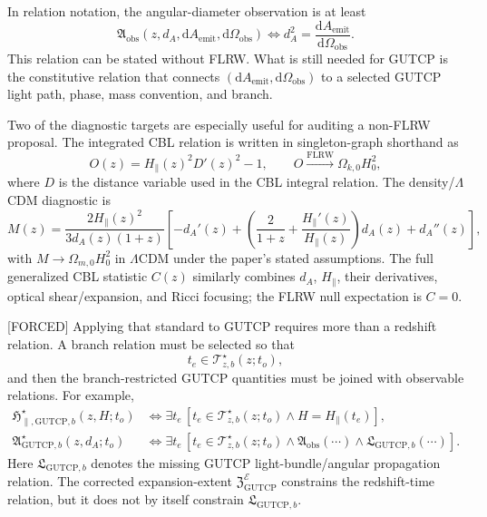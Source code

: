 \documentclass[11pt]{article}
\newcommand{\dd}{\mathrm{d}}
\newcommand{\EG}{\mathcal{E}}
\newcommand{\ZRel}{\mathfrak{Z}_{\mathrm{GUTCP}}}
\begin{document}
In relation notation, the angular-diameter observation is at least
\begin{equation}
\mathfrak{A}_{\mathrm{obs}}
\left(z,d_A,\dd A_{\mathrm{emit}},\dd\Omega_{\mathrm{obs}}\right)
\Longleftrightarrow
d_A^2=\frac{\dd A_{\mathrm{emit}}}{\dd\Omega_{\mathrm{obs}}}.
\label{eq:angular-diameter-observation}
\end{equation}
This relation can be stated without FLRW.  What is still needed for GUTCP is
the constitutive relation that connects
\((\dd A_{\mathrm{emit}},\dd\Omega_{\mathrm{obs}})\) to a selected GUTCP light
path, phase, mass convention, and branch.

Two of the diagnostic targets are especially useful for auditing a non-FLRW
proposal.  The integrated CBL relation is written in singleton-graph shorthand as
\begin{equation}
O(z)=H_{\parallel}(z)^2D'(z)^2-1,
\qquad
O \xrightarrow{\mathrm{FLRW}} \Omega_{k,0}H_0^2,
\label{eq:kh-o}
\end{equation}
where \(D\) is the distance variable used in the CBL integral relation.  The
density/\(\Lambda\)CDM diagnostic is
\begin{equation}
M(z)=
\frac{2H_{\parallel}(z)^2}{3d_A(z)(1+z)}
\left[
-d_A'(z)
+\left(\frac{2}{1+z}+\frac{H_{\parallel}'(z)}{H_{\parallel}(z)}\right)d_A(z)
+d_A''(z)
\right],
\label{eq:kh-m}
\end{equation}
with \(M\to\Omega_{m,0}H_0^2\) in \(\Lambda\)CDM under the paper's stated
assumptions.  The full generalized CBL statistic \(C(z)\) similarly combines
\(d_A\), \(H_{\parallel}\), their derivatives, optical shear/expansion, and
Ricci focusing; the FLRW null expectation is \(C=0\).

[FORCED] Applying that standard to GUTCP requires more than a redshift
relation.  A branch relation must be selected so that
\[
t_e\in\mathcal{T}_{z,b}^{\star}(z;t_o),
\]
and then the branch-restricted GUTCP quantities must be joined with
observable relations.  For example,
\begin{align}
\mathfrak{H}_{\parallel,\mathrm{GUTCP},b}^{\star}(z,H;t_o)
&\Longleftrightarrow
\exists t_e\,
\left[
t_e\in\mathcal{T}_{z,b}^{\star}(z;t_o)
\wedge H=H_{\parallel}(t_e)
\right],
\\
\mathfrak{A}_{\mathrm{GUTCP},b}^{\star}(z,d_A;t_o)
&\Longleftrightarrow
\exists t_e\,
\left[
t_e\in\mathcal{T}_{z,b}^{\star}(z;t_o)
\wedge
\mathfrak{A}_{\mathrm{obs}}(\cdots)
\wedge
\mathfrak{L}_{\mathrm{GUTCP},b}(\cdots)
\right].
\end{align}
Here \(\mathfrak{L}_{\mathrm{GUTCP},b}\) denotes the missing GUTCP
light-bundle/angular propagation relation.  The corrected expansion-extent
\(\ZRel^{\EG}\) constrains the redshift-time relation, but it does not by
itself constrain \(\mathfrak{L}_{\mathrm{GUTCP},b}\).
\end{document}
